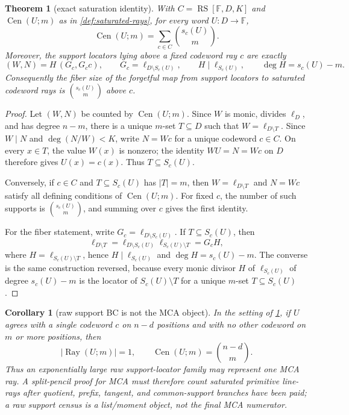 \documentclass[a4paper,11pt]{amsart}
\newtheorem{theorem}{Theorem}[section]
\newtheorem{corollary}[corollary]{Corollary}
\theoremstyle{remark}
\newcommand{\F}{\mathbb F}
\newcommand{\RS}{\operatorname{RS}}
\newcommand{\Cen}{\operatorname{Cen}}
\begin{document}
\begin{theorem}[exact saturation identity]\label{thm:saturation}
With \(C=\RS[\F,D,K]\) and \(\Cen(U;m)\) as in \cref{def:saturated-rays}, for every word \(U:D\to\F\),
\[
        \Cen(U;m)=\sum_{c\in C}\binom{s_c(U)}m .
\]
Moreover, the support locators lying above a fixed codeword ray \(c\) are exactly
\[
        (W,N)=H\,(G_c,G_cc),
        \qquad
        G_c=\ell_{D\setminus S_c(U)},
        \qquad
        H\mid\ell_{S_c(U)},
        \qquad
        \deg H=s_c(U)-m .
\]
Consequently the fiber size of the forgetful map from support locators to saturated codeword rays is \(\binom{s_c(U)}m\) above \(c\).
\end{theorem}

\begin{proof}
Let \((W,N)\) be counted by \(\Cen(U;m)\).  Since \(W\) is monic, divides \(\ell_D\), and has degree \(n-m\), there is a unique \(m\)-set \(T\subseteq D\) such that \(W=\ell_{D\setminus T}\).  Since \(W\mid N\) and \(\deg(N/W)<K\), write \(N=Wc\) for a unique codeword \(c\in C\).  On every \(x\in T\), the value \(W(x)\) is nonzero; the identity \(WU=N=Wc\) on \(D\) therefore gives \(U(x)=c(x)\).  Thus \(T\subseteq S_c(U)\).

Conversely, if \(c\in C\) and \(T\subseteq S_c(U)\) has \(|T|=m\), then \(W=\ell_{D\setminus T}\) and \(N=Wc\) satisfy all defining conditions of \(\Cen(U;m)\).  For fixed \(c\), the number of such supports is \(\binom{s_c(U)}m\), and summing over \(c\) gives the first identity.

For the fiber statement, write \(G_c=\ell_{D\setminus S_c(U)}\).  If \(T\subseteq S_c(U)\), then
\[
        \ell_{D\setminus T}
        =\ell_{D\setminus S_c(U)}\ell_{S_c(U)\setminus T}
        =G_cH,
\]
where \(H=\ell_{S_c(U)\setminus T}\), hence \(H\mid\ell_{S_c(U)}\) and \(\deg H=s_c(U)-m\).  The converse is the same construction reversed, because every monic divisor \(H\) of \(\ell_{S_c(U)}\) of degree \(s_c(U)-m\) is the locator of \(S_c(U)\setminus T\) for a unique \(m\)-set \(T\subseteq S_c(U)\).
\end{proof}

\begin{corollary}[raw support BC is not the MCA object]\label{cor:raw-bc-fails}
In the setting of \cref{thm:saturation}, if \(U\) agrees with a single codeword \(c\) on \(n-d\) positions and with no other codeword on \(m\) or more positions, then
\[
        |\operatorname{Ray}(U;m)|=1,
        \qquad
        \Cen(U;m)=\binom{n-d}{m} .
\]
Thus an exponentially large raw support-locator family may represent one MCA ray.  A split-pencil proof for MCA must therefore count saturated primitive line-rays after quotient, prefix, tangent, and common-support branches have been paid; a raw support census is a list/moment object, not the final MCA numerator.
\end{corollary}
\end{document}

